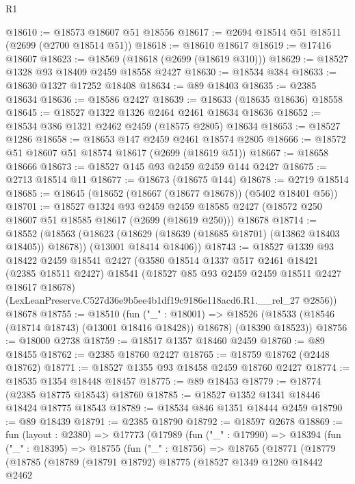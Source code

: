 \begin{lexlean}{R1}
\begin{coremodule}
@18610 := @18573 @18607 @51 @18556
@18617 := @2694 @18514 @51 @18511 (@2699 (@2700 @18514 @51))
@18618 := @18610 @18617
@18619 := @17416 @18607
@18623 := @18569 (@18618 (@2699 (@18619 @310)))
@18629 := @18527 @1328 @93 @18409 @2459 @18558 @2427
@18630 := @18534 @384
@18633 := @18630 @1327 @17252 @18408
@18634 := @89 @18403
@18635 := @2385 @18634
@18636 := @18586 @2427
@18639 := @18633 (@18635 @18636) @18558
@18645 := @18527 @1322 @1326 @2464 @2461 @18634 @18636
@18652 := @18534 @386 @1321 @2462 @2459 (@18575 @2805) @18634
@18653 := @18527 @1286
@18658 := @18653 @147 @2459 @2461 @18574 @2805
@18666 := @18572 @51 @18607 @51 @18574 @18617 (@2699 (@18619 @51))
@18667 := @18658 @18666
@18673 := @18527 @145 @93 @2459 @2459 @144 @2427
@18675 := @2713 @18514 @11
@18677 := @18673 (@18675 @144)
@18678 := @2719 @18514
@18685 := @18645 (@18652 (@18667 (@18677 @18678)) (@5402 @18401 @56))
@18701 := @18527
    @1324
    @93
    @2459
    @2459
    @18585
    @2427
    (@18572 @250 @18607 @51 @18585 @18617 (@2699 (@18619 @250)))
    @18678
@18714 := @18552
    (@18563
      (@18623 (@18629 (@18639 (@18685 @18701) (@13862 @18403 @18405)) @18678))
      (@13001 @18414 @18406))
@18743 := @18527
    @1339
    @93
    @18422
    @2459
    @18541
    @2427
    (@3580
      @18514
      @1337
      @517
      @2461
      @18421
      (@2385 @18511 @2427)
      @18541
      (@18527 @85 @93 @2459 @2459 @18511 @2427 @18617 @18678)
      (LexLeanPreserve.C527d36e9b5ee4b1df19c9186e118acd6.R1.__rel_27 @2856))
    @18678
@18755 := @18510
    (fun ("_" : @18001) =>
    @18526 (@18533 (@18546 (@18714 @18743) (@13001 @18416 @18428)) @18678) (@18390 @18523))
@18756 := @18000 @2738
@18759 := @18517 @1357 @18460 @2459
@18760 := @89 @18455
@18762 := @2385 @18760 @2427
@18765 := @18759 @18762 (@2448 @18762)
@18771 := @18527 @1355 @93 @18458 @2459 @18760 @2427
@18774 := @18535 @1354 @18448 @18457
@18775 := @89 @18453
@18779 := @18774 (@2385 @18775 @18543) @18760
@18785 := @18527 @1352 @1341 @18446 @18424 @18775 @18543
@18789 := @18534 @846 @1351 @18444 @2459
@18790 := @89 @18439
@18791 := @2385 @18790
@18792 := @18597 @2678
@18869 := fun (layout : @2380) =>
  @17773
    (@17989
      (fun ("_" : @17990) =>
      @18394
        (fun ("_" : @18395) =>
        @18755
          (fun ("_" : @18756) =>
          @18765
            (@18771
              (@18779
                (@18785
                  (@18789
                    (@18791 @18792)
                    @18775
                    (@18527
                      @1349
                      @1280
                      @18442
                      @2462

\end{coremodule}
\end{lexlean}
